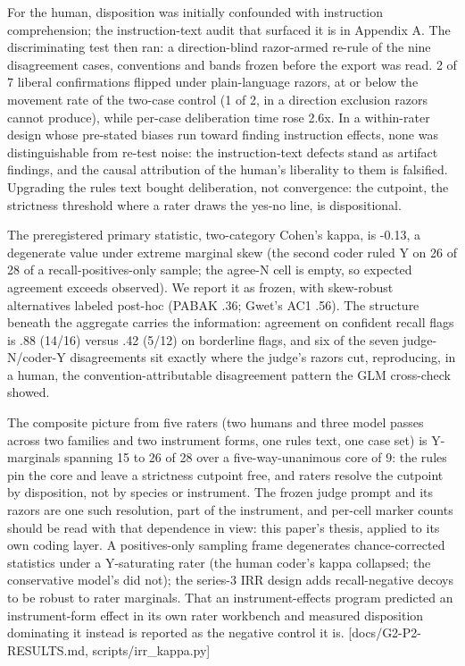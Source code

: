 \documentclass[11pt]{article}
\begin{document}
For the human, disposition was initially confounded with instruction
comprehension; the instruction-text audit that surfaced it is in
Appendix A. The discriminating test then ran: a direction-blind
razor-armed re-rule of the nine disagreement cases, conventions and
bands frozen before the export was read. 2 of 7 liberal confirmations
flipped under plain-language razors, at or below the movement rate of
the two-case control (1 of 2, in a direction exclusion razors cannot
produce), while per-case deliberation time rose 2.6x. In a within-rater
design whose pre-stated biases run toward finding instruction effects,
none was distinguishable from re-test noise: the instruction-text
defects stand as artifact findings, and the causal attribution of the
human's liberality to them is falsified. Upgrading the rules text bought
deliberation, not convergence: the cutpoint, the strictness threshold
where a rater draws the yes-no line, is dispositional.

The preregistered primary statistic, two-category Cohen's kappa, is
-0.13, a degenerate value under extreme marginal skew (the second coder
ruled Y on 26 of 28 of a recall-positives-only sample; the agree-N cell
is empty, so expected agreement exceeds observed). We report it as
frozen, with skew-robust alternatives labeled post-hoc (PABAK .36;
Gwet's AC1 .56). The structure beneath the aggregate carries the
information: agreement on confident recall flags is .88 (14/16) versus
.42 (5/12) on borderline flags, and six of the seven judge-N/coder-Y
disagreements sit exactly where the judge's razors cut, reproducing, in
a human, the convention-attributable disagreement pattern the GLM
cross-check showed.

The composite picture from five raters (two humans and three model
passes across two families and two instrument forms, one rules text, one
case set) is Y-marginals spanning 15 to 26 of 28 over a
five-way-unanimous core of 9: the rules pin the core and leave a
strictness cutpoint free, and raters resolve the cutpoint by
disposition, not by species or instrument. The frozen judge prompt and
its razors are one such resolution, part of the instrument, and per-cell
marker counts should be read with that dependence in view: this paper's
thesis, applied to its own coding layer. A positives-only sampling frame
degenerates chance-corrected statistics under a Y-saturating rater (the
human coder's kappa collapsed; the conservative model's did not); the
series-3 IRR design adds recall-negative decoys to be robust to rater
marginals. That an instrument-effects program predicted an
instrument-form effect in its own rater workbench and measured
disposition dominating it instead is reported as the negative control it
is. {[}docs/G2-P2-RESULTS.md, scripts/irr\_kappa.py{]}
\end{document}
